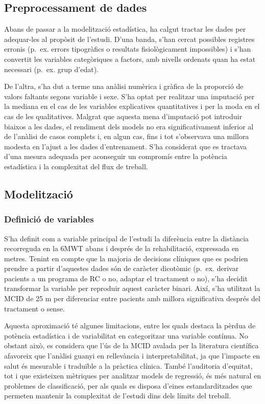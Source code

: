 \documentclass[CAT]{TFUOC}%
\begin{document}
\subsection{Preprocessament de dades}\label{preprocessament-de-dades}

Abans de passar a la modelització estadística, ha calgut tractar les dades per adequar-les al propòsit de l'estudi. D'una banda, s'han cercat possibles registres erronis (p.~ex. errors tipogràfics o resultats fisiològicament impossibles) i s'han convertit les variables categòriques a factors, amb nivells ordenats quan ha estat necessari (p.~ex. grup d'edat).

De l'altra, s'ha dut a terme una anàlisi numèrica i gràfica de la proporció de valors faltants segons variable i sexe. S'ha optat per realitzar una imputació per la mediana en el cas de les variables explicatives quantitatives i per la moda en el cas de les qualitatives. Malgrat que aquesta mena d'imputació pot introduir biaixos a les dades, el rendiment dels models no era significativament inferior al de l'anàlisi de casos complets i, en algun cas, fins i tot s'observava una millora modesta en l'ajust a les dades d'entrenament. S'ha considerat que es tractava d'una mesura adequada per aconseguir un compromís entre la potència estadística i la complexitat del flux de treball.

\subsection{Modelització}\label{modelitzaciuxf3}

\subsubsection{Definició de variables}\label{definiciuxf3-de-variables}

S'ha definit com a variable principal de l'estudi la diferència entre la distància recorreguda en la 6MWT abans i després de la rehabilitació, expressada en metres. Tenint en compte que la majoria de decisions clíniques que es podrien prendre a partir d'aquestes dades són de caràcter dicotòmic (p.~ex. derivar pacients a un programa de RC o no, adaptar el tractament o no), s'ha decidit transformar la variable per reproduir aquest caràcter binari. Així, s'ha utilitzat la MCID de 25 m per diferenciar entre pacients amb millora significativa després del tractament o sense.

Aquesta aproximació té algunes limitacions, entre les quals destaca la pèrdua de potència estadística i de variabilitat en categoritzar una variable contínua. No obstant això, es considera que l'ús de la MCID avalada per la literatura científica afavoreix que l'anàlisi guanyi en rellevància i interpretabilitat, ja que l'impacte en salut és mesurable i traduïble a la pràctica clínica. També l'auditoria d'equitat, tot i que existeixen mètriques per analitzar models de regressió, és més natural en problemes de classificació, per als quals es disposa d'eines estandarditzades que permeten mantenir la complexitat de l'estudi dins dels límits del treball.
\end{document}
